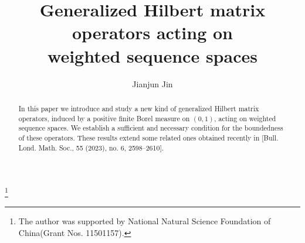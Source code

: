 \documentclass[10pt]{amsart}
\theoremstyle{definition}
\theoremstyle{question}
\numberwithin{equation}{section}
\begin{document}
\title[Generalized Hilbert matrix operators]{Generalized Hilbert matrix operators acting on\\ weighted sequence spaces}


\author{Jianjun Jin}
\address{School of Mathematics, Hefei University of Technology, Xuancheng Campus, Xuancheng 242000, P.R.China}



\thanks{The author was supported by National Natural Science Foundation of China(Grant Nos. 11501157). }







\begin{abstract}
In this paper we introduce and study a new kind of generalized Hilbert matrix operators, induced by a positive finite Borel measure on $(0,1)$, acting on weighted sequence spaces.  We establish a sufficient and necessary condition for the boundedness of these operators. These results extend some related ones obtained recently in [Bull. Lond. Math. Soc., 55 (2023), no. 6, 2598–2610].
\end{abstract}

\maketitle
\end{document}
